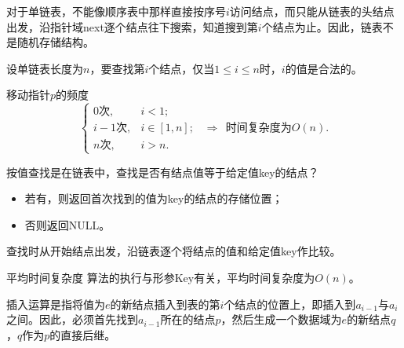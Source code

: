 \begin{frame}
 

对于单链表，不能像顺序表中那样直接按序号$i$访问结点，而只能从链表的头结点出发，沿指针域next逐个结点往下搜索，知道搜到第$i$个结点为止。因此，链表不是随机存储结构。

\vspace{0.2in}

设单链表长度为$n$，要查找第$i$个结点，仅当$1\le i \le n$时，$i$的值是合法的。
 
\end{frame}

\begin{frame}[fragile]
 

\pause
\begin{block}{移动指针$p$的频度}
\[\left\{
\begin{array}{rl}
0\mbox{次},& i<1;\\
i-1\mbox{次}, & i  \in [1,n];\\
n\mbox{次}, & i>n.
\end{array}
\right.
~~\Rightarrow~~\mbox{时间复杂度为}O(n).
\] 
\end{block}

\end{frame}


\begin{frame}
 
按值查找是在链表中，查找是否有结点值等于给定值key的结点？
\begin{itemize}
\item
若有，则返回首次找到的值为key的结点的存储位置；
\item
否则返回NULL。
\end{itemize}
查找时从开始结点出发，沿链表逐个将结点的值和给定值key作比较。

\end{frame}

\begin{frame}[fragile]
 

\pause
\begin{block}{平均时间复杂度}
算法的执行与形参Key有关，平均时间复杂度为$O(n)$。
\end{block}

\end{frame}


\begin{frame}
 
插入运算是指将值为$e$的新结点插入到表的第$i$个结点的位置上，即插入到$a_{i-1}$与$a_i$之间。因此，必须首先找到$a_{i-1}$所在的结点$p$，然后生成一个数据域为$e$的新结点$q$，$q$作为$p$的直接后继。
\end{frame}

